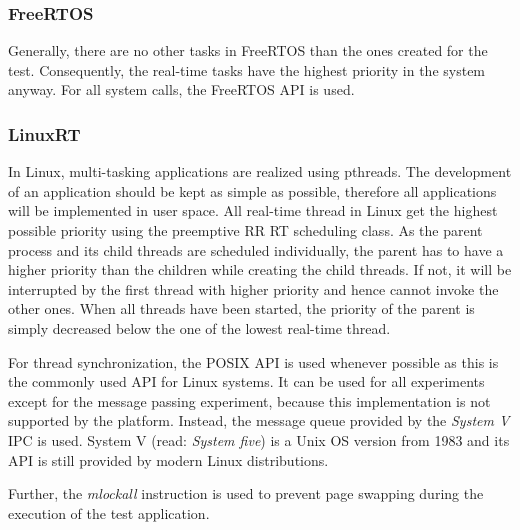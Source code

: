 \subsubsection{FreeRTOS}
Generally, there are no other tasks in FreeRTOS than the ones created for the test.
Consequently, the real-time tasks have the highest priority in the system anyway.
For all system calls, the FreeRTOS \ac{API} is used. 

\subsubsection{LinuxRT}
In Linux, multi-tasking applications are realized using pthreads.
The development of an application should be kept as simple as possible, therefore all applications will be implemented in user space.
All real-time thread in Linux get the highest possible priority using the preemptive \ac{RR} \ac{RT} scheduling class.
As the parent process and its child threads are scheduled individually, the parent has to have a higher priority than the children while creating the child threads.
If not, it will be interrupted by the first thread with higher priority and hence cannot invoke the other ones.
When all threads have been started, the priority of the parent is simply decreased below the one of the lowest real-time thread.
\par
For thread synchronization, the \ac{POSIX} \ac{API} is used whenever possible as this is the commonly used \ac{API} for Linux systems.
It can be used for all experiments except for the message passing experiment, because this implementation is not supported by the platform.
Instead, the message queue provided by the \textit{System V} \ac{IPC} is used.
System V (read: \textit{System five}) \cite{tlip:svd} is a Unix \ac{OS} version from 1983 and its \ac{API} is still provided by modern Linux distributions.
\par
Further, the \textit{mlockall} instruction is used to prevent page swapping during the execution of the test application.
 
